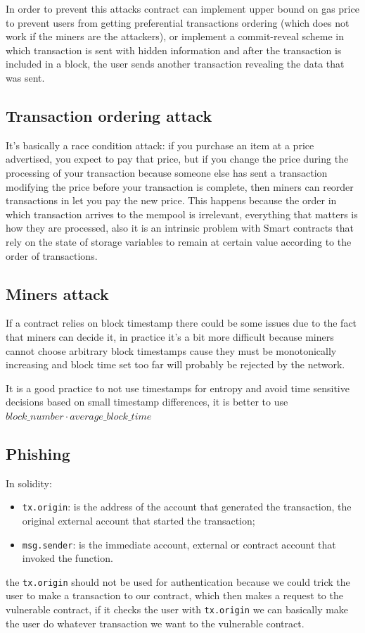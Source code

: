 In order to prevent this attacks contract can implement upper bound on gas price to prevent users from getting preferential transactions ordering (which does not work if the miners are the attackers), or implement a commit-reveal scheme in which transaction is sent with hidden information and after the transaction is included in a block, the user sends another transaction revealing the data that was sent.

\subsection{Transaction ordering attack}
It's basically a race condition attack: if you purchase an item at a price advertised, you expect to pay that price, but if you change the price during the processing of your transaction because someone else has sent a transaction modifying the price before your transaction is complete, then miners can reorder transactions in let you pay the new price.
This happens because the order in which transaction arrives to the mempool is irrelevant, everything that matters is how they are processed, also it is an intrinsic problem with Smart contracts that rely on the state of storage variables to remain at certain value according to the order of transactions.

\subsection{Miners attack}
If a contract relies on block timestamp there could be some issues due to the fact that miners can decide it, in practice it's a bit more difficult because miners cannot choose arbitrary block timestamps cause they must be monotonically increasing and block time set too far will probably be rejected by the network.

It is a good practice to not use timestamps for entropy and avoid time sensitive decisions based on small timestamp differences, it is better to use $block\_number \cdot average\_block\_time$

\subsection{Phishing}
In solidity:
\begin{itemize}
    \item \verb|tx.origin|: is the address of the account that generated the transaction, the original external account that started the transaction;
    \item \verb|msg.sender|: is the immediate account, external or contract account that invoked the function.
\end{itemize}
the \verb|tx.origin| should not be used for authentication because we could trick the user to make a transaction to our contract, which then makes a request to the vulnerable contract, if it checks the user with \verb|tx.origin| we can basically make the user do whatever transaction we want to the vulnerable contract.

